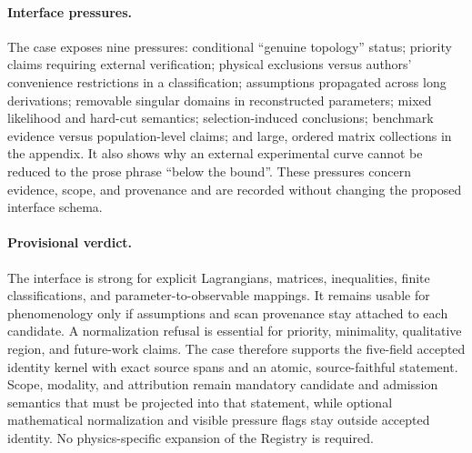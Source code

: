 \paragraph{Interface pressures.}
The case exposes nine pressures: conditional ``genuine topology'' status;
priority claims requiring external verification; physical exclusions versus
authors' convenience restrictions in a classification; assumptions propagated
across long derivations; removable singular domains in reconstructed
parameters; mixed likelihood and hard-cut semantics; selection-induced
conclusions; benchmark evidence versus population-level claims; and large,
ordered matrix collections in the appendix. It also shows why an external
experimental curve cannot be reduced to the prose phrase ``below the bound''.
These pressures concern evidence, scope, and provenance and are recorded
without changing the proposed interface schema.

\paragraph{Provisional verdict.}
The interface is strong for explicit Lagrangians, matrices, inequalities,
finite classifications, and parameter-to-observable mappings. It remains
usable for phenomenology only if assumptions and scan provenance stay attached
to each candidate. A normalization refusal is essential for priority,
minimality, qualitative region, and future-work claims. The case therefore supports the five-field accepted identity kernel with exact
source spans and an atomic, source-faithful statement. Scope, modality, and
attribution remain mandatory candidate and admission semantics that must be
projected into that statement, while optional mathematical normalization and
visible pressure flags stay outside accepted identity. No physics-specific
expansion of the Registry is required.